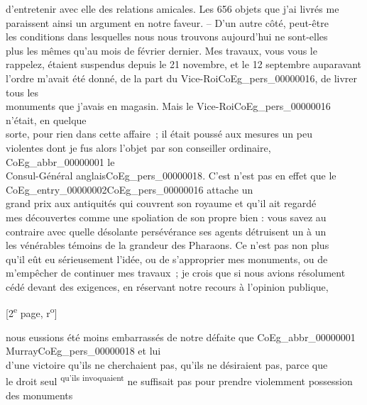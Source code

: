 \documentclass{book}
\begin{document}
d’entretenir avec elle des relations amicales. Les 656 objets que j’ai livrés me\\
paraissent ainsi un argument en notre faveur. – D’un autre côté, peut-être\\
les conditions dans lesquelles nous nous trouvons aujourd’hui ne sont-elles\\
plus les mêmes qu’au mois de février dernier. Mes travaux, vous vous le\\
rappelez, étaient suspendus depuis le 21 novembre, et le 12 septembre auparavant\\
l’ordre m’avait été donné, de la part du Vice-Roi\gls{CoEg_pers_00000016}, de livrer tous les\\
monuments que j’avais en magasin. Mais le Vice-Roi\gls{CoEg_pers_00000016} n’était, en quelque\\
sorte, pour rien dans cette affaire~; il était poussé aux mesures un peu\\
violentes dont je fus alors l’objet par son conseiller ordinaire, \gls{CoEg_abbr_00000001} le\\
Consul-Général anglais\gls{CoEg_pers_00000018}. C’est n’est pas en effet que le \gls{CoEg_entry_00000002}\gls{CoEg_pers_00000016} attache un\\
grand prix aux antiquités qui couvrent son royaume et qu’il ait regardé\\
mes découvertes comme une spoliation de son propre bien : vous savez au\\
contraire avec quelle désolante persévérance ses agents détruisent un à un\\
les vénérables témoins de la grandeur des Pharaons. Ce n’est pas non plus\\
qu’il eût eu sérieusement l’idée, ou de s’approprier mes monuments, ou de\\
m’empêcher de continuer mes travaux~; je crois que si nous avions résolument\\
cédé devant des exigences, en réservant notre recours à l’opinion publique,\\
{\footnotesize \begin{center} {[2\textsuperscript{e} page, r\textsuperscript{o}]}\end{center}}
\noindent nous eussions été moins embarrassés de notre défaite que \gls{CoEg_abbr_00000001} Murray\gls{CoEg_pers_00000018} et lui\\
d’une victoire qu’ils ne cherchaient pas, qu’ils ne désiraient pas, parce que\\
{\small le droit seul \textsuperscript{qu’ils invoquaient} ne suffisait pas pour prendre violemment possession des monuments}\\
\end{document}
